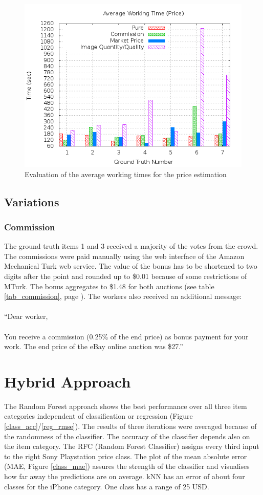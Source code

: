 \begin{figure}
\centering
\includegraphics[scale=0.55]{images/plots/crowdsourcing/plot_time_price.png}
\caption{Evaluation of the average working times for the price estimation}
\label{crowdsourcing_time_price}
\end{figure}
\subsection{Variations}
\subsubsection{Commission}
The ground truth items 1 and 3 received a majority of the votes from the crowd. The commissions were paid manually using the web interface of the Amazon Mechanical Turk web service. The value of the bonus has to be shortened to two digits after the point and rounded up to \$0.01 because of some restrictions of MTurk. The bonus aggregates to \$1.48 for both auctions (see table \ref{tab_commission}, page \pageref{tab_commission}). The workers also received an additional message:\\\\
``Dear worker, \\\\
You receive a commission (0.25\% of the end price) as bonus payment for your work. The end price of the eBay online auction was \$27.''
\section{Hybrid Approach}
The Random Forest approach shows the best performance over all three item categories independent of classification or regression (Figure \ref{class_acc}/\ref{reg_rmse}). The results of three iterations were averaged because of the randomness of the classifier. The accuracy of the classifier depends also on the item category. The RFC (Random Forest Classifier) assigns every third input to the right Sony Playstation price class. The plot of the mean absolute error (MAE, Figure \ref{class_mae}) assures the strength of the classifier and visualises how far away the predictions are on average. kNN has an error of about four classes for the iPhone category. One class has a range of 25 USD.


